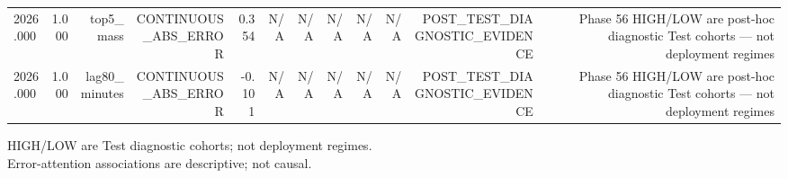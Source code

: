\begin{table}[h!]
\begin{tabular}{lrrrrrrrrrrr}
2026.000 & 1.000 & top5\_mass & CONTINUOUS\_ABS\_ERROR & 0.354 & N/A & N/A & N/A & N/A & N/A & POST\_TEST\_DIAGNOSTIC\_EVIDENCE & Phase 56 HIGH/LOW are post-hoc diagnostic Test cohorts — not deployment regimes \\
2026.000 & 1.000 & lag80\_minutes & CONTINUOUS\_ABS\_ERROR & -0.101 & N/A & N/A & N/A & N/A & N/A & POST\_TEST\_DIAGNOSTIC\_EVIDENCE & Phase 56 HIGH/LOW are post-hoc diagnostic Test cohorts — not deployment regimes \\
\bottomrule
\end{tabular}
\vspace{4pt}
\footnotesize{HIGH/LOW are Test diagnostic cohorts; not deployment regimes.}\\
\footnotesize{Error-attention associations are descriptive; not causal.}\\
\end{table}
